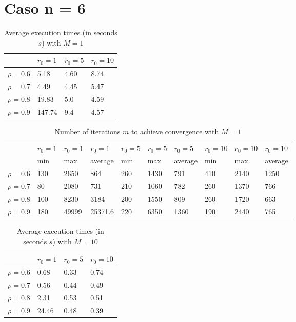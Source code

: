 \documentclass[a4paper,11pt,openright]{report}
\begin{document}
\section*{Caso n = 6}  
\begin{table}[H]
\centering
\addtolength{\leftskip}{-1.5cm}
\addtolength{\rightskip}{-1.5cm}
\begin{tabular}{|c|lll|}
\hline
$ $ & $r_0 = 1$ & $r_0 = 5$ & $r_0 = 10$ \\
\hline
$\rho = 0.6$ & 5.18 & 4.60 & 8.74 \\

$\rho = 0.7$ & 4.49 & 4.45 & 5.47 \\

$\rho = 0.8$ & 19.83 & 5.0 & 4.59 \\

$\rho = 0.9$ & 147.74 & 9.4 & 4.57 \\
\hline
\end{tabular}
\caption{Average execution
 times (in seconds $s$) with $M = 1$}
\end{table}
\begin{table}[H]
\centering
\addtolength{\leftskip}{-1.5cm}
\addtolength{\rightskip}{-1.5cm}
\begin{tabular}{|c|lllllllll|}
\hline
$ $ & $r_0 = 1$ & $r_0 = 1$ & $r_0 = 1$ & $r_0 = 5$ & $r_0 = 5$ & $r_0 = 5$ & $r_0 = 10$ & $r_0 = 10$ & $r_0 = 10$  \\
$ $ & min & max & average & min & max & average & min & max & average \\ 
\hline
$\rho = 0.6$ & 130 & 2650 & 864 & 260 & 1430 & 791 & 410 &  2140 & 1250 \\

$\rho = 0.7$ & 80 & 2080 & 731 & 210 & 1060 & 782 & 260 & 1370 & 766\\

$\rho = 0.8$ & 100 & 8230 & 3184 & 200 & 1550 & 809 & 260 & 1720 & 663\\

$\rho = 0.9$ & 180 & 49999 & 25371.6 & 220 & 6350 & 1360 & 190 & 2440 & 765\\
\hline
\end{tabular}
\caption{Number of iterations $m$ to achieve convergence with $M = 1$}
\end{table}
\begin{table}[H]
\centering
\addtolength{\leftskip}{-1.5cm}
\addtolength{\rightskip}{-1.5cm}
\begin{tabular}{|c|lll|}
\hline
$ $ & $r_0 = 1$ & $r_0 = 5$ & $r_0 = 10$ \\
\hline
$\rho = 0.6$ & 0.68 & 0.33 & 0.74 \\

$\rho = 0.7$ & 0.56 & 0.44 & 0.49 \\

$\rho = 0.8$ & 2.31 & 0.53 & 0.51 \\

$\rho = 0.9$ & 24.46 & 0.48 & 0.39 \\
\hline
\end{tabular}
\caption{Average execution
 times (in seconds $s$) with $M = 10$}
\end{table}
\end{document}
